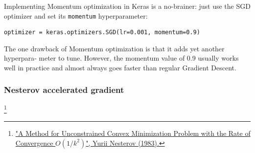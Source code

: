 Implementing Momentum optimization in Keras is a no-brainer: just use the SGD optimizer and set its \lstinline+momentum+ hyperparameter:
\begin{lstlisting}
optimizer = keras.optimizers.SGD(lr=0.001, momentum=0.9)
\end{lstlisting}
The one drawback of Momentum optimization is that it adds yet another hyperpara‐ meter to tune. However, the momentum value of 0.9 usually works well in practice and almost always goes faster than regular Gradient Descent.

\subsubsection{Nesterov accelerated gradient}\footnote{\href{https://homl.info/55}{"A Method for Unconstrained Convex Minimization Problem with the Rate of Convergence $O(1/k^2)$", Yurii Nesterov (1983).}}

